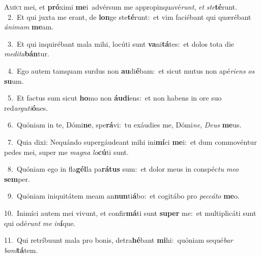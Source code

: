 \lettrine{\initial\textcolor{\initialcolor}{A}}{míci} mei, et \textbf{pró}\-ximi \textbf{me}\-i~\star advérsum me appropinquavé\-\textit{runt}\-, \textit{et} \textit{ste}\-\textbf{té}runt.\\
{\numbfont\textcolor{\numbcolor}{~2.}}~Et qui juxta me erant, de \textbf{lon}\-ge ste\-\textbf{té}\-runt:~\star et vim faciébant qui quærébant \textit{á}\-\textit{ni}\textit{mam} \textbf{me}\-am.\par
{\numbfont\textcolor{\numbcolor}{~3.}}~Et qui inquirébant mala mihi, locúti sunt \textbf{va}\-ni\-\textbf{tá}\-tes:~\star et dolos tota die \textit{me}\-\textit{di}\textit{ta}\textbf{bán}tur.\par
{\numbfont\textcolor{\numbcolor}{~4.}}~Ego autem tamquam surdus non \textbf{au}\-di\-\textbf{é}\-bam:~\star et sicut mutus non apé\-\textit{ri}\-\textit{ens} \textit{os} \textbf{su}\-um.\par
{\numbfont\textcolor{\numbcolor}{~5.}}~Et factus sum sicut \textbf{ho}\-mo non \textbf{áu}\-\textbf{di}ens:~\star et non habens in ore suo red\-\textit{ar}\-\textit{gu}\textit{ti}\textbf{ó}nes.\par
{\numbfont\textcolor{\numbcolor}{~6.}}~Quóniam in te, Dómi\-\textbf{ne}\-, spe\-\textbf{rá}\-vi:~\star tu exáudies me, Dómi\-\textit{ne}\-, \textit{De}\-\textit{us} \textbf{me}\-us.\par
{\numbfont\textcolor{\numbcolor}{~7.}}~Quia dixi: Nequándo supergáudeant mihi ini\-\textbf{mí}\-ci \textbf{me}\-i:~\star et dum commovéntur pedes mei, super me \textit{ma}\-\textit{gna} \textit{lo}\-\textbf{cú}ti sunt.\par
{\numbfont\textcolor{\numbcolor}{~8.}}~Quóniam ego in fla\-\textbf{gél}\-la pa\-\textbf{rá}\-\textbf{tus} sum:~\star et dolor meus in conspéc\textit{tu} \textit{me}\-\textit{o} \textbf{sem}\-per.\par
{\numbfont\textcolor{\numbcolor}{~9.}}~Quóniam iniquitátem meam an\-\textbf{nun}\-ti\-\textbf{á}\-bo:~\star et cogitábo pro \textit{pec}\-\textit{cá}\textit{to} \textbf{me}\-o.\par
{\numbfont\textcolor{\numbcolor}{10.}}~Inimíci autem mei vivunt, et confir\-\textbf{má}\-ti sunt \textbf{su}\-\textbf{per} me:~\star et multiplicáti sunt qui odé\textit{runt} \textit{me} \textit{in}\-\textbf{í}que.\par
{\numbfont\textcolor{\numbcolor}{11.}}~Qui retríbuunt mala pro bonis, detra\-\textbf{hé}\-bant \textbf{mi}\-hi:~\star quóniam sequé\textit{bar} \textit{bo}\-\textit{ni}\textbf{tá}tem.\par
